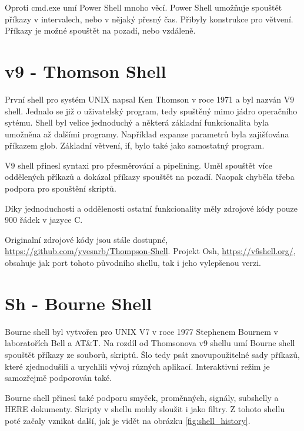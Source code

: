 \documentclass[thesis=M,czech]{FITthesis}[2012/06/26]
\begin{document}
Oproti cmd.exe umí Power Shell mnoho věcí. Power Shell umožňuje spouštět příkazy v intervalech, nebo v nějaký přesný čas. Přibyly konstrukce pro větvení. Příkazy je možné spouštět na pozadí, nebo vzdáleně.




\section{v9 - Thomson Shell}

První shell pro systém UNIX napsal Ken Thomson v roce 1971 a byl nazván V9 shell. Jednalo se již o uživatelský program, tedy spuštěný mimo jádro operačního sytému. Shell byl velice jednoduchý a některá základní funkcionalita byla umožněna až dalšími programy. Například expanze parametrů byla zajišťována příkazem glob. Základní větvení, if, bylo také jako samostatný program.

V9 shell přinesl syntaxi pro přesměrování a pipelining. Uměl spouštět více oddělených příkazů a dokázal příkazy spouštět na pozadí. Naopak chyběla třeba podpora pro spouštění skriptů.

Díky jednoduchosti a oddělenosti ostatní funkcionality měly zdrojové kódy pouze 900 řádek v jazyce C.

Originalní zdrojové kódy jsou stále dostupné, \url{https://github.com/yvesnrb/Thompson-Shell}. Projekt Osh, \url{https://v6shell.org/}, obsahuje jak port tohoto původního shellu, tak i jeho vylepšenou verzi.



%
%
%
\section{Sh - Bourne Shell}

Bourne shell byl vytvořen pro UNIX V7 v roce 1977 Stephenem Bournem v laboratořích Bell a AT\&T. Na rozdíl od Thomsonova v9 shellu umí Bourne shell spouštět příkazy ze souborů, skriptů. Šlo tedy psát znovupoužitelné sady příkazů, které zjednodušili a urychlili vývoj různých aplikací. Interaktivní režim je samozřejmě podporován také.

Bourne shell přinesl také podporu smyček, proměnných, signály, subshelly a HERE dokumenty. Skripty v shellu mohly sloužit i jako filtry. Z tohoto shellu poté začaly vznikat další, jak je vidět na obrázku \ref{fig:shell_history}.
\end{document}
